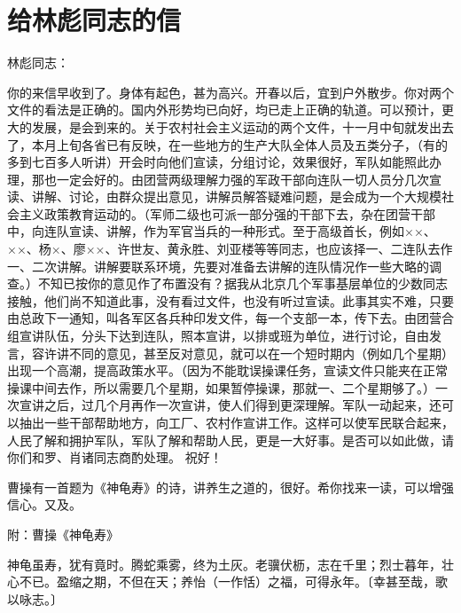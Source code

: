 \section[给林彪同志的信（一九六三年十二月十四日）]{给林彪同志的信}


林彪同志：

你的来信早收到了。身体有起色，甚为高兴。开春以后，宜到户外散步。你对两个文件的看法是正确的。国内外形势均已向好，均已走上正确的轨道。可以预计，更大的发展，是会到来的。关于农村社会主义运动的两个文件，十一月中旬就发出去了，本月上旬各省已有反映，在一些地方的生产大队全体人员及五类分子，（有的多到七百多人听讲）开会时向他们宣读，分组讨论，效果很好，军队如能照此办理，那也一定会好的。由团营两级理解力强的军政干部向连队一切人员分几次宣读、讲解、讨论，由群众提出意见，讲解员解答疑难问题，是会成为一个大规模社会主义政策教育运动的。（军师二级也可派一部分强的干部下去，杂在团营干部中，向连队宣读、讲解，作为军官当兵的一种形式。至于高级首长，例如××、××、杨×、廖××、许世友、黄永胜、刘亚楼等等同志，也应该择一、二连队去作一、二次讲解。讲解要联系环境，先要对准备去讲解的连队情况作一些大略的调查。）不知已按你的意见作了布置没有？据我从北京几个军事基层单位的少数同志接触，他们尚不知道此事，没有看过文件，也没有听过宣读。此事其实不难，只要由总政下一通知，叫各军区各兵种印发文件，每一个支部一本，传下去。由团营合组宣讲队伍，分头下达到连队，照本宣讲，以排或班为单位，进行讨论，自由发言，容许讲不同的意见，甚至反对意见，就可以在一个短时期内（例如几个星期）出现一个高潮，提高政策水平。（因为不能耽误操课任务，宣读文件只能夹在正常操课中间去作，所以需要几个星期，如果暂停操课，那就一、二个星期够了。）一次宣讲之后，过几个月再作一次宣讲，使人们得到更深理解。军队一动起来，还可以抽出一些干部帮助地方，向工厂、农村作宣讲工作。这样可以使军民联合起来，人民了解和拥护军队，军队了解和帮助人民，更是一大好事。是否可以如此做，请你们和罗、肖诸同志商酌处理。
祝好！


曹操有一首题为《神龟寿》的诗，讲养生之道的，很好。希你找来一读，可以增强信心。又及。

附：曹操《神龟寿》

神龟虽寿，犹有竟时。腾蛇乘雾，终为土灰。老骥伏枥，志在千里；烈士暮年，壮心不已。盈缩之期，不但在天；养怡（一作恬）之福，可得永年。〔幸甚至哉，歌以咏志。〕

